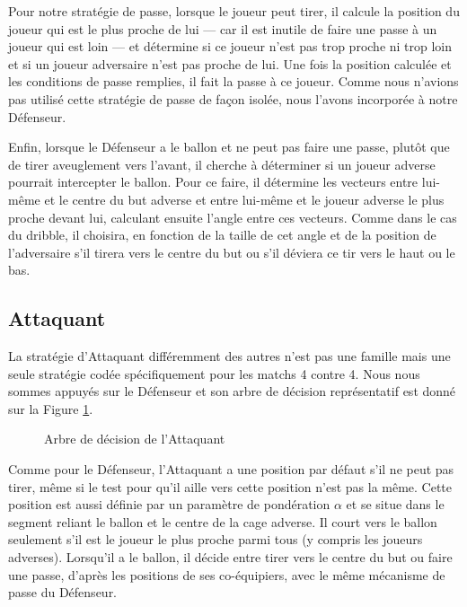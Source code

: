 \documentclass[a4paper,12pt]{article}
\begin{document}
Pour notre stratégie de passe, lorsque le joueur peut tirer, il calcule la position du joueur qui est le plus proche de lui --- car il est inutile de faire une passe à un joueur qui est loin --- et détermine si ce joueur n'est pas trop proche ni trop loin et si un joueur adversaire n'est pas proche de lui. Une fois la position calculée et les conditions de passe remplies, il fait la passe à ce joueur. Comme nous n'avions pas utilisé cette stratégie de passe de façon isolée, nous l'avons incorporée à notre Défenseur.

Enfin, lorsque le Défenseur a le ballon et ne peut pas faire une passe, plutôt que de tirer aveuglement vers l'avant, il cherche à déterminer si un joueur adverse pourrait intercepter le ballon. Pour ce faire, il détermine les vecteurs entre lui-même et le centre du but adverse et entre lui-même et le joueur adverse le plus proche devant lui, calculant ensuite l'angle entre ces vecteurs. Comme dans le cas du dribble, il choisira, en fonction de la taille de cet angle et de la position de l'adversaire s'il tirera vers le centre du but ou s'il déviera ce tir vers le haut ou le bas.

\subsection{Attaquant}

La stratégie d'Attaquant différemment des autres n'est pas une famille mais une seule stratégie codée spécifiquement pour les matchs 4 contre 4. Nous nous sommes appuyés sur le Défenseur et son arbre de décision représentatif est donné sur la Figure \ref{Figure7}. 

\begin{figure}[ht]
\centering

\caption{Arbre de décision de l'Attaquant}
\label{Figure7}
\end{figure}

Comme pour le Défenseur, l'Attaquant a une position par défaut s'il ne peut pas tirer, même si le test pour qu'il aille vers cette position n'est pas la même. Cette position est aussi définie par un paramètre de pondération $\alpha$ et se situe dans le segment reliant le ballon et le centre de la cage adverse. Il court vers le ballon seulement s'il est le joueur le plus proche parmi tous (y compris les joueurs adverses). Lorsqu'il a le ballon, il décide entre tirer vers le centre du but ou faire une passe, d'après les positions de ses co-équipiers, avec le même mécanisme de passe du Défenseur.
\end{document}
